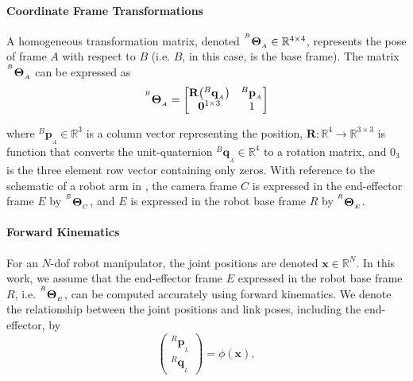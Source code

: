 \paragraph{Coordinate Frame Transformations} A homogeneous transformation matrix, denoted ${}^{^B}\mathbf{\Theta}_{_A}\in\mathbb{R}^{4 \times 4}$, represents the pose of frame $A$ with respect to $B$ (i.e. $B$, in this case, is the base frame).
The matrix ${}^{^B}\mathbf{\Theta}_{_A}$ can be expressed as
\begin{equation}
{}^{^B}\mathbf{\Theta}_{_A} = 
    \begin{bmatrix}
     \mathbf{R}\big({}^{B}\mathbf{q}_{_A}\big) & {}^{B}\mathbf{p}_{_A} \\
     \mathbf{0}^{1\times3} & 1
    \end{bmatrix}
    \label{c1:eq:ht}
\end{equation}

where ${}^{B}\mathbf{p}_{_A}\in\mathbb{R}^3$ is a column vector representing the position, $\mathbf{R}:\mathbb{R}^4\rightarrow\mathbb{R}^{3\times 3}$ is function that converts the unit-quaternion ${}^{B}\mathbf{q}_{_A}\in\mathbb{R}^4$ to a rotation matrix, and $0_3$ is the three element row vector containing only zeros.
With reference to the schematic of a robot arm in , the camera frame $C$ is expressed in the end-effector frame $E$ by ${}^{^E}\mathbf{\Theta}_{_C}$, and $E$ is expressed in the robot base frame $R$ by ${}^{^R}\mathbf{\Theta}_{_E}$. 

\paragraph{Forward Kinematics} For an $N$-\gls{dof} robot manipulator, the joint positions are denoted $\mathbf{x}\in\mathbb{R}^N$. In this work, we assume that the end-effector frame $E$ expressed in the robot base frame $R$, i.e. ${}^{^R}\mathbf{\Theta}_{_E}$, can be computed accurately using forward kinematics. We denote the relationship between the joint positions and link poses, including the end-effector, by
\begin{equation}
    \begin{pmatrix}
         {}^{R}\mathbf{p}_{_L}\\
         {}^{R}\mathbf{q}_{_L}
    \end{pmatrix}
    = \phi(\mathbf{x}),
    \label{c1:eq:fk}
\end{equation}

